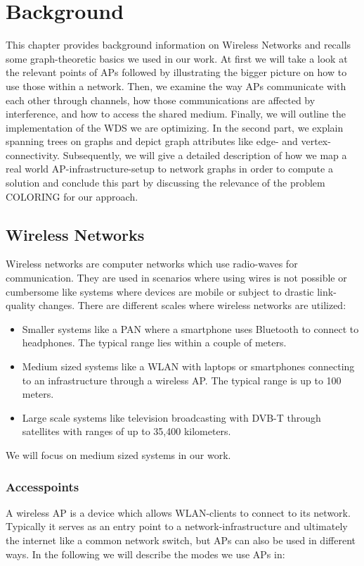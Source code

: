 \chapter{Background}
This chapter provides background information on Wireless Networks and recalls some graph-theoretic basics we used in our work.
At first we will take a look at the relevant points of APs followed by illustrating the bigger picture on how to use those
within a network. Then, we examine the way APs communicate with each other through channels, how those communications are affected by interference, and
how to access the shared medium. Finally, we will outline the implementation of the \ac{WDS} we are optimizing.
In the second part, we explain spanning trees on graphs and depict graph attributes like edge- and vertex-connectivity.
Subsequently, we will give a detailed description of how we map a real world \ac{AP}-infrastructure-setup to network graphs in order 
to compute a solution and conclude this part by discussing the relevance of the problem COLORING for our approach.

\section{Wireless Networks}
  Wireless networks are computer networks which use radio-waves for communication.
  They are used in scenarios where using wires is not possible or cumbersome like systems where devices are mobile or subject to drastic link-quality changes.
  There are different scales where wireless networks are utilized:
  \begin{itemize}
    \item Smaller systems like a \ac{PAN} where a smartphone uses Bluetooth to connect to headphones. The typical range lies within a couple of meters.
    \item Medium sized systems like a \ac{WLAN} with laptops or smartphones connecting to an infrastructure through a wireless \ac{AP}.
      The typical range is up to 100 meters.
    \item Large scale systems like television broadcasting with \ac{DVB-T} through satellites with ranges of up to 35,400 kilometers.
  \end{itemize}
  
  We will focus on medium sized systems in our work.

  \subsection{Accesspoints}
    A wireless \ac{AP} is a device which allows \ac{WLAN}-clients to connect to its network.
    Typically it serves as an entry point to a network-infrastructure and ultimately the internet like a common network switch, 
    but APs can also be used in different ways. In the following we will describe the modes we use APs in:
    
